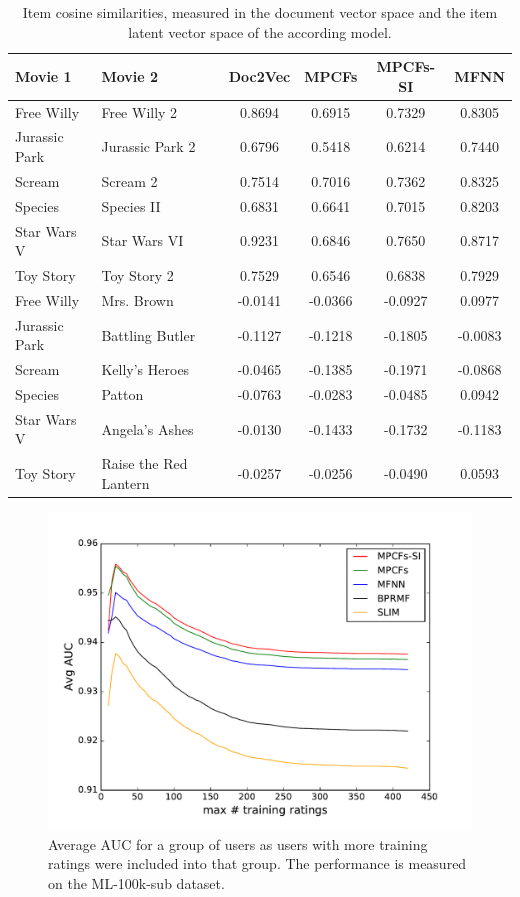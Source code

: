 \begin{table}[p]
	\begin{center}
		\begin{tabularx}{\linewidth}{XXcccc}
			\hline \hline
			\textbf{Movie 1} & \textbf{Movie 2} & \textbf{Doc2Vec} & \textbf{MPCFs} & \textbf{MPCFs-SI} & \textbf{MFNN} \\
			\hline
			Free Willy & Free Willy 2 & 0.8694 & 0.6915 & 0.7329 & 0.8305\\
			Jurassic Park & Jurassic Park 2 & 0.6796 & 0.5418 & 0.6214 & 0.7440\\
			Scream & Scream 2 & 0.7514 & 0.7016 & 0.7362 & 0.8325\\
			Species & Species II & 0.6831 & 0.6641 & 0.7015 & 0.8203\\
			Star Wars V & Star Wars VI & 0.9231 & 0.6846 & 0.7650 & 0.8717\\
			Toy Story & Toy Story 2 & 0.7529 & 0.6546 & 0.6838 & 0.7929\\
			\hline
			Free Willy & Mrs. Brown & -0.0141 & -0.0366 & -0.0927 & 0.0977\\
			Jurassic Park & Battling Butler & -0.1127 & -0.1218 & -0.1805 & -0.0083\\
			Scream & Kelly's Heroes & -0.0465 & -0.1385 & -0.1971 & -0.0868\\
			Species & Patton & -0.0763 & -0.0283 & -0.0485 & 0.0942\\
			Star Wars V & Angela's Ashes & -0.0130 & -0.1433 & -0.1732 & -0.1183\\
			Toy Story & Raise the Red Lantern & -0.0257 & -0.0256 & -0.0490 & 0.0593\\
			\hline \hline
		\end{tabularx}
	\end{center}
	\caption{Item cosine similarities, measured in the document vector space and the item latent vector space of the according model.}
	\label{tab:item-factor-sim}
\end{table}


\begin{figure}[p]
	\centering
	\includegraphics[width=0.7\linewidth]{./section-chapter2/figures/ml-100k_comparison_auc.pdf}
	\caption{Average AUC for a group of users as users with more training ratings were included into that group.
		The performance is measured on the ML-100k-sub dataset.}
	\label{f:ml-100k-comp-auc}
\end{figure}

